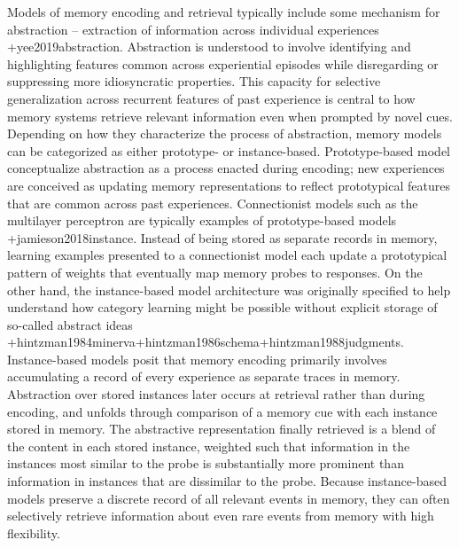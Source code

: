 \markdownRendererInterblockSeparator
{}Models of memory encoding and retrieval typically include some mechanism for abstraction -- extraction of information across individual experiences +{}{}{yee2019abstraction}. Abstraction is understood to involve identifying and highlighting features common across experiential episodes while disregarding or suppressing more idiosyncratic properties. This capacity for selective generalization across recurrent features of past experience is central to how memory systems retrieve relevant information even when prompted by novel cues.\markdownRendererInterblockSeparator
{}Depending on how they characterize the process of abstraction, memory models can be categorized as either prototype- or instance-based. Prototype-based model conceptualize abstraction as a process enacted during encoding; new experiences are conceived as updating memory representations to reflect prototypical features that are common across past experiences. Connectionist models such as the multilayer perceptron are typically examples of prototype-based models +{}{}{jamieson2018instance}. Instead of being stored as separate records in memory, learning examples presented to a connectionist model each update a prototypical pattern of weights that eventually map memory probes to responses.\markdownRendererInterblockSeparator
{}On the other hand, the instance-based model architecture was originally specified to help understand how category learning might be possible without explicit storage of so-called abstract ideas +{}{}{hintzman1984minerva}+{}{}{hintzman1986schema}+{}{}{hintzman1988judgments}. Instance-based models posit that memory encoding primarily involves accumulating a record of every experience as separate traces in memory. Abstraction over stored instances later occurs at retrieval rather than during encoding, and unfolds through comparison of a memory cue with each instance stored in memory. The abstractive representation finally retrieved is a blend of the content in each stored instance, weighted such that information in the instances most similar to the probe is substantially more prominent than information in instances that are dissimilar to the probe. Because instance-based models preserve a discrete record of all relevant events in memory, they can often selectively retrieve information about even rare events from memory with high flexibility.\markdownRendererInterblockSeparator
